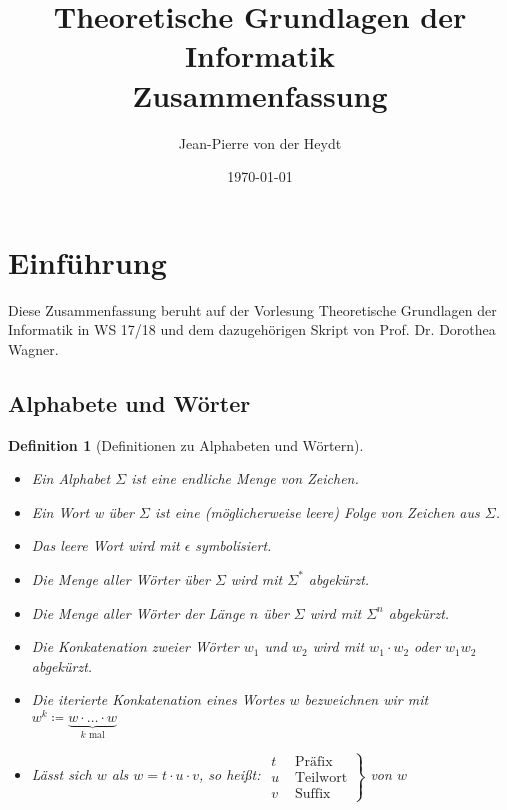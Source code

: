 \documentclass[11pt]{article}
\title{Theoretische Grundlagen der Informatik\\ Zusammenfassung}
\author{Jean-Pierre von der Heydt}
\date{\today}
\theoremstyle{break}
\newtheorem{defi}[satz]{Definition}
\begin{document}
\maketitle
\pagebreak

\tableofcontents
\pagebreak



\section{Einführung} 

Diese Zusammenfassung beruht auf der Vorlesung Theoretische Grundlagen der Informatik in WS 17/18 und dem dazugehörigen Skript von Prof. Dr. Dorothea Wagner.

\subsection{Alphabete und Wörter}

\begin{defi}[Definitionen zu Alphabeten und Wörtern]
\begin{itemize}
\item Ein Alphabet $\Sigma$ ist eine endliche Menge von Zeichen.
\item Ein Wort w über $\Sigma$ ist eine (möglicherweise leere) Folge von Zeichen aus $\Sigma$.
\item Das leere Wort wird mit $\epsilon$ symbolisiert.
\item Die Menge aller Wörter über $\Sigma$ wird mit $\Sigma^*$ abgekürzt.
\item Die Menge aller Wörter der Länge $n$ über $\Sigma$ wird mit $\Sigma^n$ abgekürzt.
\item Die Konkatenation zweier Wörter $w_1$ und $w_2$ wird mit $w_1\cdot w_2$ oder $w_1w_2$ abgekürzt.
\item Die iterierte Konkatenation eines Wortes $w$ bezweichnen wir mit $w^k\coloneqq \underbrace{w\cdot\dots\cdot w}_{k\text{ mal}}$
\item Lässt sich $w$ als $w=t\cdot u\cdot v$, so heißt:
$\left. \begin{array}{cc} 	
							t &\text{ Präfix}\\
							u &\text{ Teilwort}\\
							v &\text{ Suffix} 
\end{array} \right\}$
von $w$
\end{itemize}
\end{defi}
\end{document}
